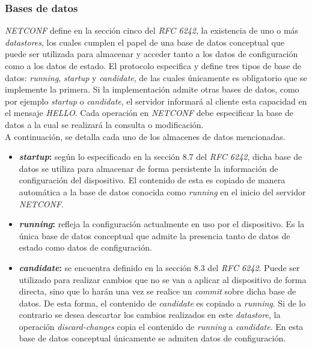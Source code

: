   \subsubsection{Bases de datos}
  \textit{NETCONF} define en la sección cinco del \textit{RFC 6242}, la existencia de uno o más \textit{datastores}, los cuales cumplen el papel de una base de datos conceptual que puede ser utilizada para almacenar y acceder tanto a los datos de configuración como a los datos de estado. El protocolo especifica y define tres tipos de base de datos: \textit{running}, \textit{startup} y \textit{candidate}, de las cuales únicamente es obligatorio que se implemente la primera. Si la implementación admite otras bases de datos, como por ejemplo \textit{startup} o \textit{candidate}, el servidor informará al cliente esta capacidad en el mensaje \textit{HELLO}. Cada operación en \textit{NETCONF} debe especificar la base de datos a la cual se realizará la consulta o modificación.
  \\

  A continuación, se detalla cada uno de los almacenes de datos mencionadas.
\begin{itemize}
	\item \textbf{\textit{startup}:} según lo especificado en la sección 8.7 del \textit{RFC 6242}, dicha base de datos se utiliza para almacenar de forma persistente la información de configuración del dispositivo. El contenido de esta es copiado de manera automática a la base de datos conocida como \textit{running} en el inicio del servidor \textit{NETCONF}. 
	\item \textbf{\textit{running}:} refleja la configuración actualmente en uso por el dispositivo. Es la única base de datos conceptual que admite la presencia tanto de datos de estado como datos de configuración. 
	\item \textbf{\textit{candidate}:} se encuentra definido en la sección 8.3 del \textit{RFC 6242}. Puede ser utilizado para realizar cambios que no se van a aplicar al dispositivo de forma directa, sino que lo harán una vez se realice un \textit{commit} sobre dicha base de datos. De esta forma, el contenido de \textit{candidate} es copiado a \textit{running}. Si de lo contrario se desea descartar los cambios realizados en este \textit{datastore}, la operación \textit{discard-changes} copia el contenido de \textit{running} a \textit{candidate}. En esta base de datos conceptual únicamente se admiten datos de configuración.
\end{itemize}


